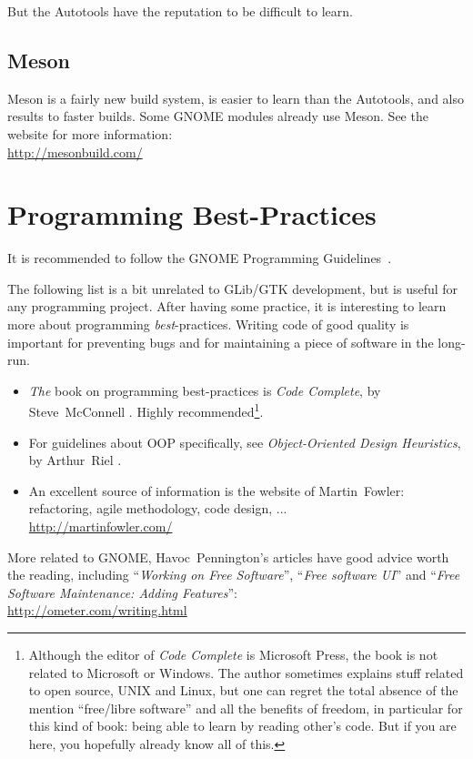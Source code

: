 But the Autotools have the reputation to be difficult to learn.

\subsection{Meson}

Meson is a fairly new build system, is easier to learn than the Autotools, and also results to faster builds. Some GNOME modules already use Meson. See the website for more information:\\
\url{http://mesonbuild.com/}

\section{Programming Best-Practices}

It is recommended to follow the GNOME Programming Guidelines~\cite{gnome-programming-guidelines}.

The following list is a bit unrelated to GLib/GTK development, but is useful for any programming project. After having some practice, it is interesting to learn more about programming \emph{best}-practices. Writing code of good quality is important for preventing bugs and for maintaining a piece of software in the long-run.

\begin{itemize}
  \item \emph{The} book on programming best-practices is \emph{Code Complete}, by Steve~McConnell \cite{code-complete}. Highly recommended\footnote{Although the editor of \emph{Code Complete} is Microsoft Press, the book is not related to Microsoft or Windows. The author sometimes explains stuff related to open source, UNIX and Linux, but one can regret the total absence of the mention ``free/libre software'' and all the benefits of freedom, in particular for this kind of book: being able to learn by reading other's code. But if you are here, you hopefully already know all of this.}.

  \item For guidelines about OOP specifically, see \emph{Object-Oriented Design Heuristics}, by Arthur~Riel \cite{oop-book}.

  \item An excellent source of information is the website of Martin~Fowler: refactoring, agile methodology, code design, ...\\
  \url{http://martinfowler.com/}
\end{itemize}

More related to GNOME, Havoc~Pennington's articles have good advice worth the reading, including ``\emph{Working on Free Software}'', ``\emph{Free software UI}'' and ``\emph{Free Software Maintenance: Adding Features}'':\\
\url{http://ometer.com/writing.html}
